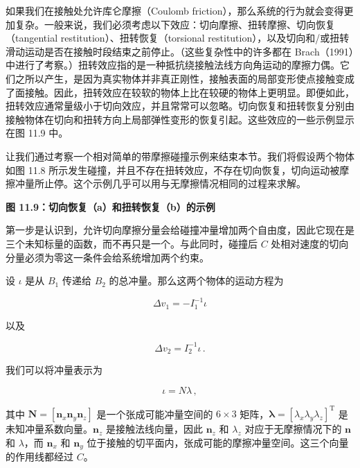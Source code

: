 \documentclass[10pt,a4paper]{book}
\theoremstyle{thmstyle} %
\theoremstyle{defstyle} %
\theoremstyle{prostyle} %
\begin{document}
如果我们在接触处允许库仑摩擦（Coulomb friction），那么系统的行为就会变得更加复杂。一般来说，我们必须考虑以下效应：切向摩擦、扭转摩擦、切向恢复（tangential restitution）、扭转恢复（torsional restitution），以及切向和/或扭转滑动运动是否在接触时段结束之前停止。（这些复杂性中的许多都在 Brach（1991）中进行了考察。）扭转效应指的是一种抵抗绕接触法线方向角运动的摩擦力偶。它们之所以产生，是因为真实物体并非真正刚性，接触表面的局部变形使点接触变成了面接触。因此，扭转效应在较软的物体上比在较硬的物体上更明显。即便如此，扭转效应通常量级小于切向效应，并且常常可以忽略。切向恢复和扭转恢复分别由接触物体在切向和扭转方向上局部弹性变形的恢复引起。这些效应的一些示例显示在图 11.9 中。



让我们通过考察一个相对简单的带摩擦碰撞示例来结束本节。我们将假设两个物体如图 11.8 所示发生碰撞，并且不存在扭转效应，不存在切向恢复，切向运动被摩擦冲量所止停。这个示例几乎可以用与无摩擦情况相同的过程来求解。



\noindent\textbf{图 11.9：切向恢复（a）和扭转恢复（b）的示例}





第一步是认识到，允许切向摩擦分量会给碰撞冲量增加两个自由度，因此它现在是三个未知标量的函数，而不再只是一个。与此同时，碰撞后 $C$ 处相对速度的切向分量必须为零这一条件会给系统增加两个约束。



设 $\iota$ 是从 $B_{1}$ 传递给 $B_{2}$ 的总冲量。那么这两个物体的运动方程为



$$
\Delta v _{1} = - I _{1} ^{-1} \iota
$$



以及



$$
\Delta v _{2} = I _{2} ^{-1} \iota \, .
$$



我们可以将冲量表示为



$$
\iota = N \lambda \, ,
$$



其中 $\boldsymbol{N}=[\boldsymbol{n}_{x} \boldsymbol{n}_{y} \boldsymbol{n}_{z}]$ 是一个张成可能冲量空间的 $6 \times 3$ 矩阵，$\boldsymbol{\lambda}=[\lambda_{x} \lambda_{y} \lambda_{z}]^{\mathrm{T}}$ 是未知冲量系数向量。$\boldsymbol{n}_{z}$ 是接触法线向量，因此 $\boldsymbol{n}_{z}$ 和 $\lambda_{z}$ 对应于无摩擦情况下的 $\boldsymbol{n}$ 和 $\lambda$，而 $\boldsymbol{n}_{x}$ 和 $\boldsymbol{n}_{y}$ 位于接触的切平面内，张成可能的摩擦冲量空间。这三个向量的作用线都经过 $C$。
\end{document}

